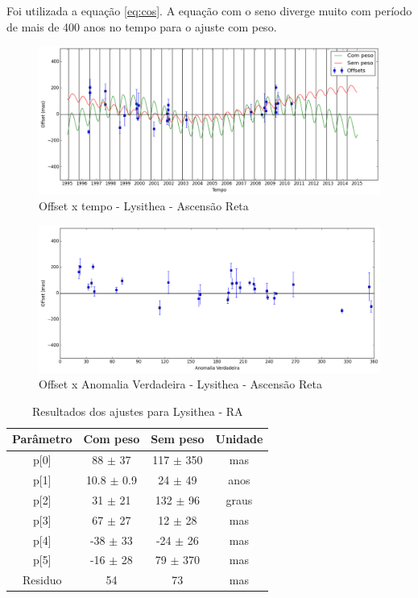 \documentclass[11pt,a4paper]{report}
\begin{document}
Foi utilizada a equação \ref{eq:cos}. A equação com o seno diverge muito com período de mais de 400 anos no tempo para o ajuste com peso.

\begin{figure}[h]
\caption{Offset x tempo - Lysithea - Ascensão Reta}
\includegraphics[scale=0.45]{Lysithea/RA.png} 
\end{figure}

\begin{figure}[h]
\caption{Offset x Anomalia Verdadeira - Lysithea - Ascensão Reta}
\includegraphics[scale=0.45]{Lysithea/RA_anom.png}  
\end{figure}

\begin{table}[h!]
\caption{\label{Tab: Lysithea-RA} Resultados dos ajustes para Lysithea - RA}
\begin{centering}
\begin{tabular}{cccc}
\hline
\hline
Parâmetro & Com peso & Sem peso & Unidade\tabularnewline
\hline
p[0] & 88 $\pm$ 37 & 117 $\pm$ 350 & mas\\
p[1] & 10.8 $\pm$ 0.9 & 24 $\pm$ 49 & anos\\
p[2] & 31 $\pm$ 21 & 132 $\pm$ 96 & graus\\
p[3] & 67 $\pm$ 27 & 12 $\pm$ 28 & mas\\
p[4] & -38 $\pm$ 33 & -24 $\pm$ 26 & mas\\
p[5] & -16 $\pm$ 28 & 79 $\pm$ 370 & mas\\
Residuo & 54 & 73 & mas\\
\hline 
\end{tabular} 
\par\end{centering}
\end{table}
\end{document}
